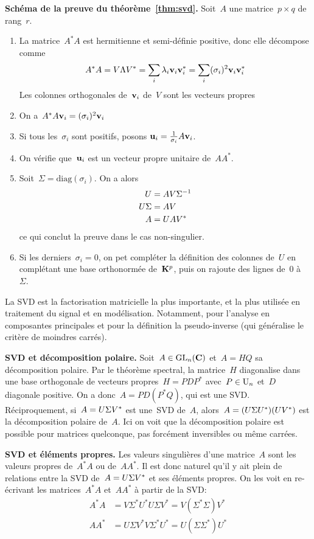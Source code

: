 {\bf Schéma de la preuve du théorème~\ref{thm:svd}.}
Soit~$A$ une matrice~$p\times q$ de rang~$r$.
\begin{enumerate}
	\item La matrice~$A^*A$ est hermitienne et semi-définie positive, donc elle
		décompose comme
		\[
		A^*A=V\Lambda V^*
		=\sum_i\lambda_i\mathbf{v}_i\mathbf{v}_i^*
		=\sum_i(\sigma_i)^2\mathbf{v}_i\mathbf{v}_i^*
		\]
	Les colonnes orthogonales de~$\mathbf{v}_i$ de~$V$ sont les vecteurs propres
	\item On a~$A^*A\mathbf{v}_i=(\sigma_i)^2\mathbf{v}_i$
	\item Si tous les~$\sigma_i$ sont positifs, posons
		$\mathbf{u}_i=\tfrac1{\sigma_i}A\mathbf{v}_i$.
	\item On vérifie que~$\mathbf{u}_i$ est un vecteur propre unitaire de~$AA^*$.
	\item Soit~$\Sigma=\mathrm{diag}(\sigma_i)$.  On a alors
		\begin{align*}
			U & =A V\Sigma^{-1} \\
			U\/\Sigma & =A V \\
			A & =U\/A V^* \\
		\end{align*}
		ce qui conclut la preuve dans le cas non-singulier.
	\item Si les derniers~$\sigma_i=0$, on pet compléter la définition des
		colonnes de~$U$ en complétant une base orthonormée de~$\mathbf{K}^p$, puis on
		rajoute des lignes de~$0$ à~$\Sigma$.
\end{enumerate}

\bigskip

La SVD est la factorisation matricielle la plus importante, et la plus
utilisée en traitement du signal et en modélisation.  Notamment, pour
l'analyse en composantes principales et pour la définition la pseudo-inverse
(qui généralise le critère de moindres carrés).

{\bf SVD et décomposition polaire.}
Soit~$A\in\mathrm{GL}_n(\mathbf{C})$ et~$A=HQ$ sa décomposition polaire.  Par le théorème
spectral, la matrice~$H$ diagonalise dans une base orthogonale de vecteurs
propres~$H=PDP^*$ avec~$P\in\mathrm{U}_n$ et~$D$ diagonale positive.  On a
donc~$A=PD(P^*Q)$, qui est une SVD.
Réciproquement, si~$A=U\/\Sigma V^*$ est une~SVD de~$A$,
alors~$A=(U\/\Sigma U^*)(UV^*)$ est la décomposition polaire de~$A$.  Ici on
voit que la décomposition polaire est possible pour matrices quelconque, pas
forcément inversibles ou même carrées.

{\bf SVD et éléments propres.}
Les valeurs singulières d'une matrice~$A$ sont les valeurs propres de~$A^*A$
ou de~$AA^*$.  Il est donc naturel qu'il y ait plein de relations entre
la SVD de~$A=U\/\Sigma V^*$ et ses éléments propres.  On les voit en re-écrivant
les matrices~$A^*A$ et~$AA^*$ à partir de la SVD:
\begin{align*}
	A^*A & = V\Sigma^*U^* U\Sigma V^* = V(\Sigma^*\Sigma)V^* \\
	AA^* & = U\Sigma V^* V\Sigma^* U^* = U(\Sigma\Sigma^*)U^*
\end{align*}

